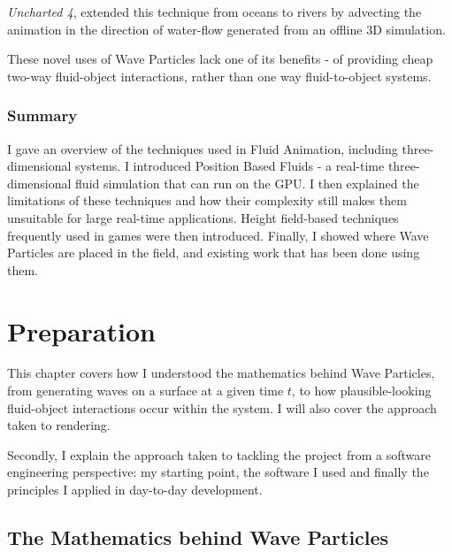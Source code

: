 \documentclass[12pt,a4paper,twoside]{report}
\begin{document}
\textit{Uncharted 4}, extended this technique from oceans to rivers by
advecting the animation in the direction of water-flow generated from an
offline 3D simulation.

These novel uses of Wave Particles lack one of its benefits - of providing
cheap two-way fluid-object interactions, rather than one way fluid-to-object
systems.

\subsection{Summary}

I gave an overview of the techniques used in Fluid Animation, including
three-dimensional systems. I introduced Position Based Fluids - a real-time
three-dimensional fluid simulation that can run on the GPU. I then explained
the limitations of these techniques and how their complexity still makes them
unsuitable for large real-time applications. Height field-based techniques
frequently used in games were then introduced. Finally, I showed where Wave
Particles are placed in the field, and existing work that has been done using
them.

\chapter{Preparation}

This chapter covers how I understood the mathematics behind Wave Particles,
from generating waves on a surface at a given time $t$, to how
plausible-looking fluid-object interactions occur within the system. I will
also cover the approach taken to rendering.

Secondly, I explain the approach taken to tackling the project from a
software engineering perspective: my starting point, the software I used and
finally the principles I applied in day-to-day development.




\section{The Mathematics behind Wave Particles}
\end{document}
